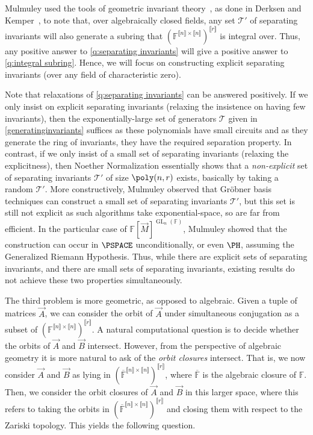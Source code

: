 \documentclass[letterpaper,11pt]{article}
\numberwithin{equation}{section}
\theoremstyle{plain}
\theoremstyle{remark}
\newcommand{\zr}[1]{{\llbracket {#1}\rrbracket}}
\DeclareMathOperator{\GL}{GL}
\newcommand{\F}{\mathbb{F}}
\newcommand{\cT}{\mathcal{T}}
\begin{document}
Mulmuley used the tools of geometric invariant theory~\cite{MFK}, as done in Derksen and Kemper~\cite{DK}, to note that, over algebraically closed fields, any set $\cT'$ of separating invariants will also generate a subring that $(\F^{\zr{n}\times \zr{n}})^{\zr{r}}$ is integral over.  Thus, any positive answer to \autoref{q:separating invariants} will give a positive answer to \autoref{q:integral subring}. Hence, we will focus on constructing explicit separating invariants (over any field of characteristic zero).

Note that relaxations of \autoref{q:separating invariants} can be answered positively. If we only insist on explicit separating invariants (relaxing the insistence on having few invariants), then the exponentially-large set of generators $\cT$ given in \autoref{generatinginvariants} suffices as these polynomials have small circuits and as they generate the ring of invariants, they have the required separation property. In contrast, if we only insist of a small set of separating invariants (relaxing the explicitness), then  Noether Normalization essentially shows that a \textit{non-explicit} set of separating invariants $\cT'$ of size $\poly(n,r)$ exists, basically by taking a random $\cT'$. More constructively, Mulmuley observed that Gr\"{o}bner basis techniques can construct a small set of separating invariants $\cT'$, but this set is still not explicit as such algorithms take exponential-space, so are far from efficient. In the particular case of $\F[\vec{M}]^{\GL_n(\F)}$, Mulmuley showed that the construction can occur in $\PSPACE$ unconditionally, or even $\PH$, assuming the Generalized Riemann Hypothesis. Thus, while there are explicit sets of separating invariants, and there are small sets of separating invariants, existing results do not achieve these two properties simultaneously.

The third problem is more geometric, as opposed to algebraic.  Given a tuple of matrices $\vec{A}$, we can consider the orbit of $\vec{A}$ under simultaneous conjugation as a subset of $(\F^{\zr{n}\times \zr{n}})^{\zr{r}}$. A natural computational question is to decide whether the orbits of $\vec{A}$ and $\vec{B}$ intersect.  However, from the perspective of algebraic geometry it is more natural to ask of the \textit{orbit closures} intersect. That is, we now consider $\vec{A}$ and $\vec{B}$ as lying in $(\overline{\F}^{\zr{n}\times \zr{n}})^{\zr{r}}$, where $\overline{\F}$ is the algebraic closure of $\F$.  Then, we consider the orbit closures of $\vec{A}$ and $\vec{B}$ in this larger space, where this refers to taking the orbits in $(\overline{\F}^{\zr{n}\times \zr{n}})^{\zr{r}}$ and closing them with respect to the Zariski topology. This yields the following question.
\end{document}

